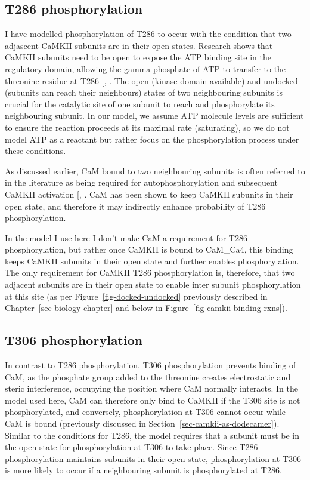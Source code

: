 \documentclass[
  11pt,
  letterpaper,
]{scrreprt}
\begin{document}
\subsection{T286 phosphorylation}\label{t286-phosphorylation}

I have modelled phosphorylation of T286 to occur with the condition that
two adjascent CaMKII subunits are in their open states. Research shows
that CaMKII subunits need to be open to expose the ATP binding site in
the regulatory domain, allowing the gamma-phosphate of ATP to transfer
to the threonine residue at T286
{[},
\citeproc{ref-hoffman2011Investigation}{468}{]}. The open (kinase domain
available) and undocked (subunits can reach their neighbours) states of
two neighbouring subunits is crucial for the catalytic site of one
subunit to reach and phosphorylate its neighbouring subunit. In our
model, we assume ATP molecule levels are sufficient to ensure the
reaction proceeds at its maximal rate (saturating), so we do not model
ATP as a reactant but rather focus on the phosphorylation process under
these conditions.

As discussed earlier, CaM bound to two neighbouring subunits is often
referred to in the literature as being required for autophosphorylation
and subsequent CaMKII activation
{[},
\citeproc{ref-nicoll2005Synaptic}{193}{]}. CaM has been shown to keep
CaMKII subunits in their open state, and therefore it may indirectly
enhance probability of T286 phosphorylation.

In the model I use here I don't make CaM a requirement for T286
phosphorylation, but rather once CaMKII is bound to CaM\_Ca4, this
binding keeps CaMKII subunits in their open state and further enables
phosphorylation. The only requirement for CaMKII T286 phosphorylation
is, therefore, that two adjacent subunits are in their open state to
enable inter subunit phosphorylation at this site (as per
Figure~\ref{fig-docked-undocked} previously described in
Chapter~\ref{sec-biology-chapter} and below in
Figure~\ref{fig-camkii-binding-rxns}).

\subsection{T306 phosphorylation}\label{t306-phosphorylation}

In contrast to T286 phosphorylation, T306 phosphorylation prevents
binding of CaM, as the phosphate group added to the threonine creates
electrostatic and steric interference, occupying the position where CaM
normally interacts. In the model used here, CaM can therefore only bind
to CaMKII if the T306 site is not phosphorylated, and conversely,
phosphorylation at T306 cannot occur while CaM is bound (previously
discussed in Section~\ref{sec-camkii-as-dodecamer}). Similar to the
conditions for T286, the model requires that a subunit must be in the
open state for phosphorylation at T306 to take place. Since T286
phosphorylation maintains subunits in their open state, phosphorylation
at T306 is more likely to occur if a neighbouring subunit is
phosphorylated at T286.
\end{document}
